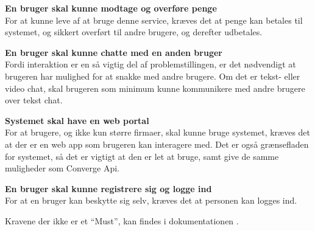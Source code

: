 \textbf{En bruger skal kunne modtage og overføre penge} \\
For at kunne leve af at bruge denne service, kræves det at penge kan betales til systemet, og sikkert overført til andre brugere, og derefter udbetales.

\textbf{En bruger skal kunne chatte med en anden bruger} \\
Fordi interaktion er en så vigtig del af problemstillingen, er det nødvendigt at brugeren har mulighed for at snakke med andre brugere. Om det er tekst- eller video chat, skal brugeren som minimum kunne kommunikere med andre brugere over tekst chat.

\textbf{Systemet skal have en web portal} \\
For at brugere, og ikke kun større firmaer, skal kunne bruge systemet, kræves det at der er en web app som brugeren kan interagere med. Det er også grænsefladen for systemet, så det er vigtigt at den er let at bruge, samt give de samme muligheder som Converge Api.

\textbf{En bruger skal kunne registrere sig og logge ind} \\
For at en bruger kan beskytte sig selv, kræves det at personen kan logges ind.

Kravene der ikke er et “Must”, kan findes i dokumentationen \cite{documentation-kravspec}. 
